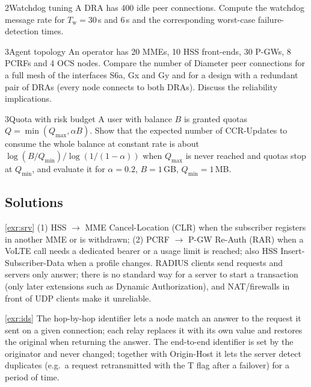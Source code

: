 \documentclass[11pt,a4paper]{article}
\begin{document}
\begin{exercisebox}{2}{Watchdog tuning}\label{exr:watchdog}
A DRA has 400 idle peer connections. Compute the watchdog message rate for $T_\mathrm{w} = 30$\,s and $6$\,s and
the corresponding worst-case failure-detection times.
\end{exercisebox}

\begin{exercisebox}{3}{Agent topology}\label{exr:topo}
An operator has 20 MMEs, 10 HSS front-ends, 30 P-GWs, 8 PCRFs and 4 OCS nodes. Compare the number of Diameter
peer connections for a full mesh of the interfaces S6a, Gx and Gy and for a design with a redundant pair of DRAs
(every node connects to both DRAs). Discuss the reliability implications.
\end{exercisebox}

\begin{exercisebox}{3}{Quota with risk budget}\label{exr:risk}
A user with balance $B$ is granted quotas $Q = \min(Q_{\max}, \alpha B)$. Show that the expected number of
CCR-Updates to consume the whole balance at constant rate is about $\log(B/Q_{\min})/\log(1/(1-\alpha))$ when
$Q_{\max}$ is never reached and quotas stop at $Q_{\min}$, and evaluate it for $\alpha = 0.2$,
$B = 1$\,GB, $Q_{\min} = 1$\,MB.
\end{exercisebox}

\subsection*{Solutions}

\begin{solutionbox}{\ref{exr:srv}}
(1) HSS $\to$ MME Cancel-Location (CLR) when the subscriber registers in another MME or is withdrawn; (2) PCRF
$\to$ P-GW Re-Auth (RAR) when a VoLTE call needs a dedicated bearer or a usage limit is reached; also HSS
Insert-Subscriber-Data when a profile changes. RADIUS clients send requests and servers only answer; there is
no standard way for a server to start a transaction (only later extensions such as Dynamic Authorization), and
NAT/firewalls in front of UDP clients make it unreliable.
\end{solutionbox}

\begin{solutionbox}{\ref{exr:ids}}
The hop-by-hop identifier lets a node match an answer to the request it sent on a given connection; each relay
replaces it with its own value and restores the original when returning the answer. The end-to-end identifier
is set by the originator and never changed; together with Origin-Host it lets the server detect duplicates
(e.g.\ a request retransmitted with the T flag after a failover) for a period of time.
\end{solutionbox}
\end{document}
